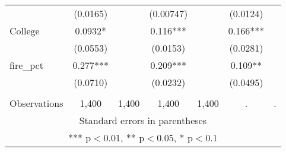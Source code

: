 \begin{tabular}{lcccccc}
 & (0.0165) &  & (0.00747) &  & (0.0124) &  \\
College & 0.0932* &  & 0.116*** &  & 0.166*** &  \\
 & (0.0553) &  & (0.0153) &  & (0.0281) &  \\
fire\_pct & 0.277*** &  & 0.209*** &  & 0.109** &  \\
 & (0.0710) &  & (0.0232) &  & (0.0495) &  \\
 &  &  &  &  &  &  \\
 Observations & 1,400 & 1,400 & 1,400 & 1,400 & . & . \\ \hline
\multicolumn{7}{c}{ Standard errors in parentheses} \\
\multicolumn{7}{c}{ *** p$<$0.01, ** p$<$0.05, * p$<$0.1} \\
\end{tabular}
